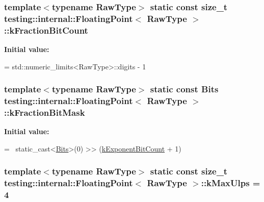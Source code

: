 \hypertarget{classtesting_1_1internal_1_1_floating_point_a2d98c93a74099d1a422e8fa34761d354}{
\subsubsection[{k\-Fraction\-Bit\-Count}]{\setlength{\rightskip}{0pt plus 5cm}template$<$typename Raw\-Type$>$ static const size\-\_\-t {\bf testing\-::internal\-::\-Floating\-Point}$<$ Raw\-Type $>$\-::k\-Fraction\-Bit\-Count\hspace{0.3cm}{\ttfamily [static]}}}\label{classtesting_1_1internal_1_1_floating_point_a2d98c93a74099d1a422e8fa34761d354}
{\bfseries Initial value\-:}
\begin{DoxyCode}
=
    std::numeric\_limits<RawType>::digits - 1
\end{DoxyCode}
\hypertarget{classtesting_1_1internal_1_1_floating_point_a2f3ae7ced0ef045915fa8d1c6148ab13}{
\subsubsection[{k\-Fraction\-Bit\-Mask}]{\setlength{\rightskip}{0pt plus 5cm}template$<$typename Raw\-Type$>$ static const {\bf Bits} {\bf testing\-::internal\-::\-Floating\-Point}$<$ Raw\-Type $>$\-::k\-Fraction\-Bit\-Mask\hspace{0.3cm}{\ttfamily [static]}}}\label{classtesting_1_1internal_1_1_floating_point_a2f3ae7ced0ef045915fa8d1c6148ab13}
{\bfseries Initial value\-:}
\begin{DoxyCode}
=
    ~static\_cast<\hyperlink{classtesting_1_1internal_1_1_floating_point_abf228bf6cd48f12c8b44c85b4971a731}{Bits}>(0) >> (\hyperlink{classtesting_1_1internal_1_1_floating_point_a6a6c6f2dd2d6aa335034738290dd9506}{kExponentBitCount} + 1)
\end{DoxyCode}
\hypertarget{classtesting_1_1internal_1_1_floating_point_ab60226288e04df52433c032065df28ea}{
\subsubsection[{k\-Max\-Ulps}]{\setlength{\rightskip}{0pt plus 5cm}template$<$typename Raw\-Type$>$ static const size\-\_\-t {\bf testing\-::internal\-::\-Floating\-Point}$<$ Raw\-Type $>$\-::k\-Max\-Ulps = 4\hspace{0.3cm}{\ttfamily [static]}}}\label{classtesting_1_1internal_1_1_floating_point_ab60226288e04df52433c032065df28ea}
